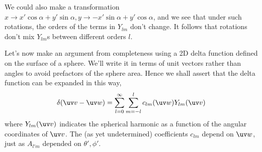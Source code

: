 We could also make a transformation $x\to x'\cos\alpha + y' \sin \alpha, y \to -x' \sin\alpha + y'\cos\alpha$, and we see that under such rotations, the orders of the terms in $Y_{lm}$ don't change. It follows that rotations don't mix $Y_{lm}$s between different orders $l$.

Let's now make an argument from completeness using a 2D delta function defined on the surface of a sphere. We'll write it in terms of unit vectors rather than angles to avoid prefactors of the sphere area. Hence we shall assert that the delta function can be expanded in this way,
\begin{equation}
    \delta(\uv v - \uv w)= \sum_{l=0}^\infty \sum_{m=-l}^l c_{lm}(\uv w) Y_{lm}(\uv v)
\end{equation}
where $Y_{lm}(\uv v)$ indicates the spherical harmonic as a function of the angular coordinates of $\uv v$. The (as yet undetermined) coefficients $c_{lm}$ depend on $\uv w$, just as $A_{l'm}$ depended on $\theta',\phi'$.

